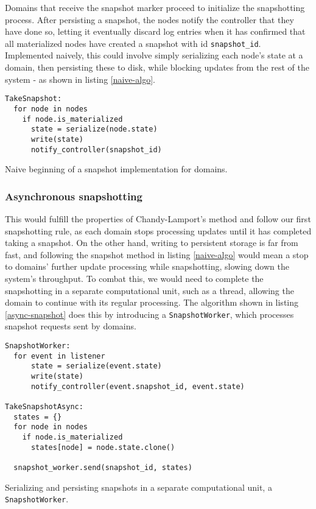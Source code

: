 \documentclass[b5paper]{report}
\begin{document}
Domains that receive the snapshot marker proceed to initialize the
snapshotting process. After persisting a snapshot, the nodes notify the
controller that they have done so, letting it eventually discard log entries
when it has confirmed that all materialized nodes have created a snapshot with
id \texttt{snapshot\_id}. Implemented naively, this could involve simply
serializing each node's state at a domain, then persisting these to disk, while
blocking updates from the rest of the system - as shown in listing
\ref{naive-algo}.

\begin{listing}[H]
  \begin{verbatim}
TakeSnapshot:
  for node in nodes
    if node.is_materialized
      state = serialize(node.state)
      write(state)
      notify_controller(snapshot_id)
  \end{verbatim}
  \caption{
    Naive beginning of a snapshot implementation for domains.
    \label{naive-algo}
  }
\end{listing}

\subsubsection{Asynchronous snapshotting} \label{sec:async-snapshot}
This would fulfill the properties of Chandy-Lamport's method and follow our
first snapshotting rule, as each domain stops processing updates until it has
completed taking a snapshot. On the other hand, writing to persistent storage is
far from fast, and following the snapshot method in listing \ref{naive-algo}
would mean a stop to domains' further update processing while snapshotting,
slowing down the system's throughput. To combat this, we would need to complete
the snapshotting in a separate computational unit, such as a thread, allowing
the domain to continue with its regular processing. The algorithm shown in
listing \ref{async-snapshot} does this by introducing a \texttt{SnapshotWorker},
which processes snapshot requests sent by domains.

\begin{listing}[H]
  \begin{verbatim}
SnapshotWorker:
  for event in listener
      state = serialize(event.state)
      write(state)
      notify_controller(event.snapshot_id, event.state)

TakeSnapshotAsync:
  states = {}
  for node in nodes
    if node.is_materialized
      states[node] = node.state.clone()

  snapshot_worker.send(snapshot_id, states)
  \end{verbatim}
  \caption{
    Serializing and persisting snapshots in a separate computational unit, a
    \texttt{SnapshotWorker}.
    \label{async-snapshot}
  }
\end{listing}
\end{document}
